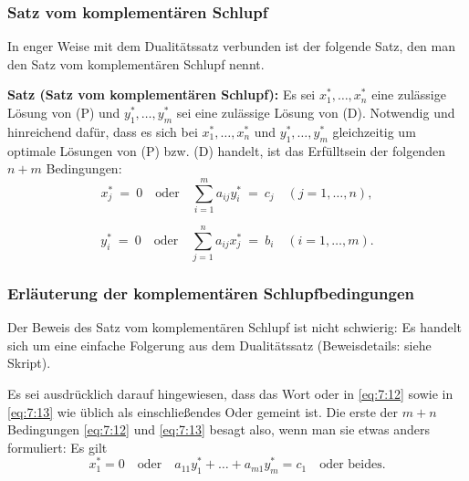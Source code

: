 \documentclass[smaller]{beamer}
\begin{document}
\begin{frame}
 \frametitle{Satz vom komplementären Schlupf}
 In enger Weise mit dem Dualitätssatz verbunden ist der folgende Satz, den man den \alert{Satz vom komplementären Schlupf} nennt. \\ \vspace*{0.2cm}

\textbf{Satz (Satz vom komplementären Schlupf):}
Es sei $x_1^*,\ldots,x_n^*$ eine zulässige Lösung von (P) und $y_1^*,\ldots,y_m^*$ sei eine zulässige Lösung von (D). Notwendig und hinreichend dafür, dass es sich bei $x_1^*,\ldots,x_n^*$ und $y_1^*,\ldots,y_m^*$ gleichzeitig um optimale Lösungen von (P) bzw. (D) handelt, ist das Erfülltsein der folgenden $n+m$ Bedingungen:
\begin{equation}
\label{eq:7:12}
x_j^* \ = \ 0 \quad \text{oder} \quad \sum\limits_{i=1}^{m}{a_{ij}y_i^*} \ = \ c_j \quad (j=1,\ldots,n),
\end{equation}

\begin{equation}
\label{eq:7:13}
y_i^* \ = \ 0 \quad \text{oder} \quad \sum\limits_{j=1}^{n}{a_{ij}x_j^*} \ = \ b_i \quad (i=1,\ldots,m).
\end{equation}
\end{frame}

\begin{frame}
 \frametitle{Erläuterung der komplementären Schlupfbedingungen}
 Der Beweis des Satz vom komplementären Schlupf ist nicht schwierig: {Es handelt sich um eine \alert{einfache Folgerung aus dem Dualitätssatz} (Beweisdetails: siehe Skript).} \\ \vspace*{0.2cm}
 
 Es sei ausdrücklich darauf hingewiesen, dass das Wort {\glqq}oder{\grqq} in \eqref{eq:7:12} sowie in \eqref{eq:7:13} wie üblich als {\glqq}einschließendes Oder{\grqq} gemeint ist. Die erste der $m+n$ Bedingungen \eqref{eq:7:12} und \eqref{eq:7:13} besagt also, wenn man sie etwas anders formuliert: Es gilt
 \begin{equation*}
 x_1^*=0 \quad \text{oder} \quad a_{11}y_1^* + \ldots + a_{m1}y_m^*=c_1 \quad \text{oder beides}.
 \end{equation*}
\end{frame}
\end{document}
